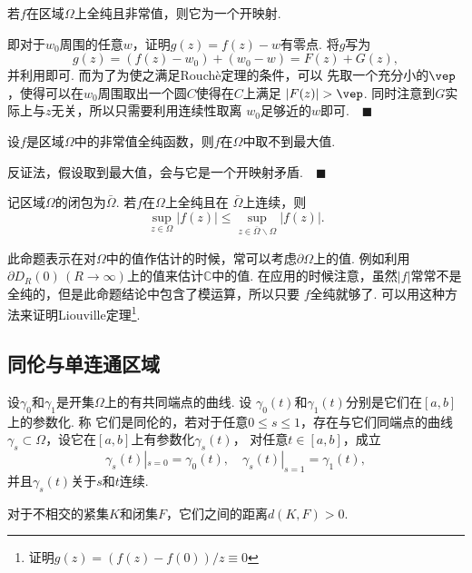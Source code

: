   \begin{thm}[开映射]
    若$f$在区域$\Omega$上全纯且非常值，则它为一个开映射.
  \end{thm}
  \proof
    即对于$w_0$周围的任意$w$，证明$g(z)=f(z)-w$有零点. 将$g$写为
    \[
      g(z) = (f(z)-w_0) + (w_0-w) = F(z) + G(z),
    \]
    并利用即可. 而为了为使之满足Rouchè定理的条件，可以
    先取一个充分小的$\vep$，使得可以在$w_0$周围取出一个圆$C$使得在$C$上满足
    $|F(z)|>\vep$. 同时注意到$G$实际上与$z$无关，所以只需要利用连续性取离
    $w_0$足够近的$w$即可.$\quad\blacksquare$


   \begin{thm}[最大模原理]
    设$f$是区域$\Omega$中的非常值全纯函数，则$f$在$\Omega$中取不到最大值.
  \end{thm}
  \proof
    反证法，假设取到最大值，会与它是一个开映射矛盾.$\quad\blacksquare$

  \begin{cor}
    记区域$\Omega$的闭包为$\bar{\Omega}$. 若$f$在$\Omega$上全纯且在
    $\bar{\Omega}$上连续，则
    \[
      \sup_{z\in\Omega}|f(z)| \le \sup_{z\in\bar{\Omega}\backslash\Omega}|f(z)|.
    \]
  \end{cor}
  \remark
    此命题表示在对$\Omega$中的值作估计的时候，常可以考虑$\partial\Omega$上的值.
    例如利用$\partial D_R(0)\,(R\to\infty)$上的值来估计$\mathbb{C}$中的值. 
    在应用的时候注意，虽然$|f|$常常不是全纯的，但是此命题结论中包含了模运算，所以只要
    $f$全纯就够了.
    可以用这种方法来证明Liouville定理\footnote{证明$g(z)=(f(z)-f(0))/z\equiv 0$}. 


\subsection{同伦与单连通区域}

  \begin{defi}[同伦]
    设$\gamma_0$和$\gamma_1$是开集$\Omega$上的有共同端点的曲线. 设
    $\gamma_0(t)$和$\gamma_1(t)$分别是它们在$[a,b]$上的参数化. 称
    它们是同伦的，若对于任意$0\le s\le 1$，存在与它们同端点的曲线
    $\gamma_s\subset\Omega$，设它在$[a,b]$上有参数化$\gamma_s(t)$，
    对任意$t\in [a,b]$，成立
    \[
      \gamma_s(t)|_{s=0} = \gamma_0(t),\quad 
      \gamma_s(t)|_{s=1} = \gamma_1(t),
    \]
    并且$\gamma_s(t)$关于$s$和$t$连续.
  \end{defi}

  \begin{lemma}
    \label{lemma: 紧集、闭集、距离}
    对于不相交的紧集$K$和闭集$F$，它们之间的距离$d(K, F)>0$.
  \end{lemma}

